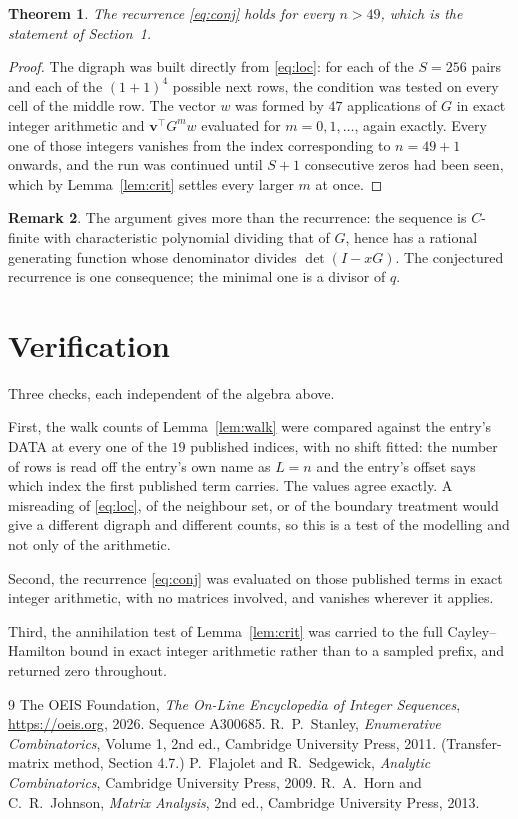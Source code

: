 \documentclass[11pt,a4paper]{article}
\theoremstyle{plain}
\newtheorem{theorem}{Theorem}
\theoremstyle{definition}
\newtheorem{remark}[theorem]{Remark}
\begin{document}
\begin{theorem}
The recurrence \eqref{eq:conj} holds for every $n>49$, which is the statement of
Section~1.
\end{theorem}

\begin{proof}
The digraph was built directly from \eqref{eq:loc}: for each of the $S=256$ pairs and each
of the $(1+1)^{4}$ possible next rows, the condition was tested on every cell of
the middle row. The vector $w$ was formed by $47$ applications of $G$ in exact integer
arithmetic and $\mathbf{v}^{\!\top}G^{m}w$ evaluated for $m=0,1,\dots$, again exactly.
Every one of those integers vanishes from the index corresponding to $n=49+1$ onwards,
and the run was continued until $S+1$ consecutive zeros had been seen, which by
Lemma~\ref{lem:crit} settles every larger $m$ at once.
\end{proof}

\begin{remark}
The argument gives more than the recurrence: the sequence is $C$-finite with characteristic
polynomial dividing that of $G$, hence has a rational generating function whose denominator
divides $\det(I-xG)$. The conjectured recurrence is one consequence; the minimal one is a
divisor of $q$.
\end{remark}

\section{Verification}

Three checks, each independent of the algebra above.

First, the walk counts of Lemma~\ref{lem:walk} were compared against the entry's DATA at
every one of the $19$ published indices, with no shift fitted: the number of rows is
read off the entry's own name as $L=n$ and the entry's offset says which index the first
published term carries. The values agree exactly. A misreading of \eqref{eq:loc}, of the
neighbour set, or of the boundary treatment would give a different digraph and different
counts, so this is a test of the modelling and not only of the arithmetic.

Second, the recurrence \eqref{eq:conj} was evaluated on those published terms in exact
integer arithmetic, with no matrices involved, and vanishes wherever it applies.

Third, the annihilation test of Lemma~\ref{lem:crit} was carried to the full
Cayley--Hamilton bound in exact integer arithmetic rather than to a sampled prefix, and
returned zero throughout.

\begin{thebibliography}{9}
 The OEIS Foundation, \emph{The On-Line Encyclopedia of Integer
Sequences}, \url{https://oeis.org}, 2026. Sequence A300685.
 R.~P.~Stanley, \emph{Enumerative Combinatorics}, Volume 1, 2nd ed.,
Cambridge University Press, 2011. (Transfer-matrix method, Section 4.7.)
 P.~Flajolet and R.~Sedgewick, \emph{Analytic Combinatorics}, Cambridge
University Press, 2009.
 R.~A.~Horn and C.~R.~Johnson, \emph{Matrix Analysis}, 2nd ed., Cambridge
University Press, 2013.
\end{thebibliography}
\end{document}
